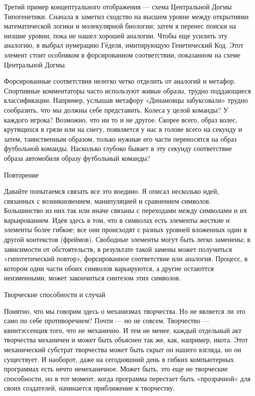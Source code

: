 \documentclass[../main.tex]{subfiles}
\begin{document}
Третий пример концептуального отображения --- схема Центральной Догмы Типогенетики. Сначала я заметил сходство на высшем уровне между открытиями математической логики и молекулярной биологии; затем я перенес поиски на низшие уровни, пока не нашел хорошей аналогии. Чтобы еще усилить эту аналогию, я выбрал нумерацию Гёделя, имитирующую Генетический Код. Этот элемент стоит особняком в форсированном соответствии, показанном на схеме Центральной Догмы.

Форсированные соответствия нелегко четко отделить от аналогий и метафор. Спортивные комментаторы часто используют живые образы, трудно поддающиеся классификации. Например, услышав метафору «Динамовцы забуксовали» трудно сообразить, что мы должны себе представить. Колеса у целой команды? У каждого игрока? Возможно, что ни то и не другое. Скорее всего, образ колес, крутящихся в грязи или на снегу, появляется у нас в голове всего на секунду и затем, таинственным образом, только нужные его части переносятся на образ футбольной команды. Насколько глубоко бывает в эту секунду соответствие образа автомобиля образу футбольный команды?

Повторение

Давайте попытаемся связать все это воедино. Я описал несколько идей, связанных с возникновением, манипуляцией и сравнением символов. Большинство из них так или иначе связаны с переходами между символами и их варьированием. Идея здесь в том, что в символах есть элементы жесткие и элементы более гибкие; все они происходят с разных уровней вложенных один в другой контекстов (фреймов). Свободные элементы могут быть легко заменены; в зависимости от обстоятельств, в результате такой замены может получиться «гипотетический повтор», форсированное соответствие или аналогия. Процесс, в котором одни части обоих символов варьируются, а другие остаюттся неизменными, может закончиться синтезом этих символов.

Творческие способности и случай

Понятно, что мы говорим здесь о механизмах творчества. Но не является ли это само по себе противоречием? Почти --- но не совсем. Творчество --- квинтэссенция того, что не механично. И тем не менее, каждый отдельный акт творчества механичен и может быть объяснен так же, как, например, икота. Этот механический субстрат творчества может быть скрыт он нашего взгляда, но он существует. И наоборот, даже на сегодняшний день в гибких компьютерных программах есть нечто немеханичное. Может быть, это еще не творческие способности, но в тот момент, когда программа перестает быть «прозрачной» для своих создателей, начинается приближение к творчеству.
\end{document}
